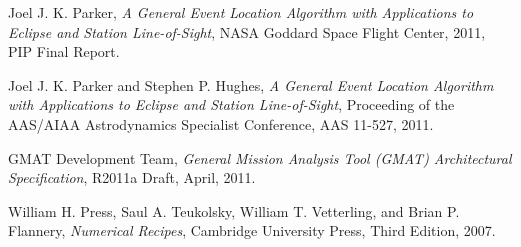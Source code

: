 \documentclass[letterpaper,10pt]{article}
\begin{document}
\begin{thebibliography}{10}

Joel J. K. Parker, \emph{A General Event Location Algorithm with
Applications to Eclipse and Station Line-of-Sight}, NASA Goddard Space Flight
Center, 2011, PIP Final Report.

Joel J. K. Parker and Stephen P. Hughes, \emph{A General
Event Location Algorithm with Applications to Eclipse and Station
Line-of-Sight}, Proceeding of the AAS/AIAA Astrodynamics Specialist Conference,
AAS 11-527, 2011.

GMAT Development Team, \emph{General Mission Analysis Tool
(GMAT) Architectural Specification}, R2011a Draft, April, 2011.

William H. Press, Saul A. Teukolsky, William T. Vetterling, and
Brian P. Flannery, \emph{Numerical Recipes}, Cambridge University Press, Third
Edition, 2007.

\end{thebibliography}
\end{document}
